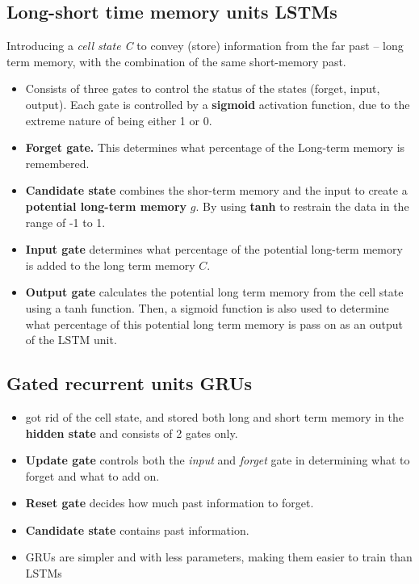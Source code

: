 \documentclass[a4paper,10pt]{article}
\begin{document}
\subsection{Long-short time memory units LSTMs}
Introducing a \textit{cell state C} to convey (store) information from the far past -- long term memory, with the combination of the same short-memory past. 
\begin{itemize}
    \item Consists of three gates to control the status of the states (forget, input, output). Each gate is controlled by a \textbf{sigmoid} activation function, due to the extreme nature of being either 1 or 0.
    \item \textbf{Forget gate.} This determines what percentage of the Long-term memory is remembered. 
    \item \textbf{Candidate state} combines the shor-term memory and the input to create a \textbf{potential long-term memory} $g$. By using \textbf{tanh} to restrain the data in the range of -1 to 1. 
    \item \textbf{Input gate} determines what percentage of the potential long-term memory is added to the long term memory $C$.
    \item \textbf{Output gate} calculates the potential long term memory from the cell state using a tanh function. Then, a sigmoid function is also used to determine what percentage of this potential long term memory is pass on as an output of the LSTM unit. 
\end{itemize}

\subsection{Gated recurrent units GRUs}
\begin{itemize}
    \item got rid of the cell state, and stored both long and short term memory in the \textbf{hidden state} and consists of 2 gates only.
    \item \textbf{Update gate} controls both the \textit{input} and \textit{forget} gate in determining what to forget and what to add on. 
    \item \textbf{Reset gate} decides how much past information to forget. 
    \item \textbf{Candidate state} contains past information.
    \item GRUs are simpler and with less parameters, making them easier to train than LSTMs
\end{itemize}
\end{document}
